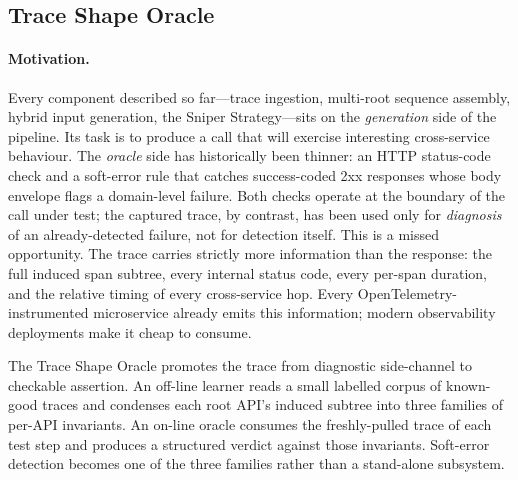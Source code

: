 \documentclass[conference]{IEEEtran}
\begin{document}
\subsection{Trace Shape Oracle}\label{ssec:tso}

\paragraph{Motivation.}
Every component described so far---trace ingestion, multi-root sequence assembly, hybrid input generation, the Sniper Strategy---sits on the \emph{generation} side of the pipeline. Its task is to produce a call that will exercise interesting cross-service behaviour. The \emph{oracle} side has historically been thinner: an HTTP status-code check and a soft-error rule that catches success-coded 2xx responses whose body envelope flags a domain-level failure. Both checks operate at the boundary of the call under test; the captured trace, by contrast, has been used only for \emph{diagnosis} of an already-detected failure, not for detection itself. This is a missed opportunity. The trace carries strictly more information than the response: the full induced span subtree, every internal status code, every per-span duration, and the relative timing of every cross-service hop. Every OpenTelemetry-instrumented microservice already emits this information; modern observability deployments make it cheap to consume.

The Trace Shape Oracle promotes the trace from diagnostic side-channel to checkable assertion. An off-line learner reads a small labelled corpus of known-good traces and condenses each root API's induced subtree into three families of per-API invariants. An on-line oracle consumes the freshly-pulled trace of each test step and produces a structured verdict against those invariants. Soft-error detection becomes one of the three families rather than a stand-alone subsystem.
\end{document}
